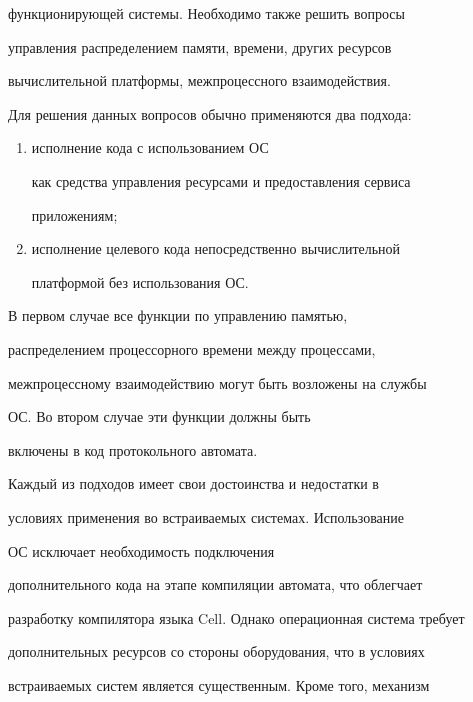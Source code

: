 функционирующей сис\-те\-мы. Необходимо также решить вопросы 


управления распределением памяти, времени, других ресурсов 


вычислительной платформы, межпроцессного взаимодействия.


      


      Для решения данных вопросов обычно применяются два подхода:


      \begin{enumerate}[(1)]


      \item исполнение кода с использованием ОС 


как средства управления ресурсами и предоставления сервиса 


приложениям;


      \item исполнение целевого кода непосредственно вычислительной 


платформой без использования ОС.


      \end{enumerate}


      


      В первом случае все функции по управлению памятью, 


распределением процессорного времени между процессами, 


межпроцессному взаимодействию могут быть возложены на службы 


ОС. Во втором случае эти функции должны быть 


включены в код протокольного автомата. 


      


      Каждый из подходов имеет свои достоинства и недостатки в 


условиях применения во встраиваемых сис\-те\-мах. Использование 


ОС исключает необходимость подключения 


дополнительного кода на этапе компиляции автомата, что облегчает 


разработку компилятора языка Cell. Однако операционная сис\-те\-ма требует 


дополнительных ресурсов со стороны оборудования, что в условиях 


встраиваемых систем является существенным. Кроме того, механизм 


